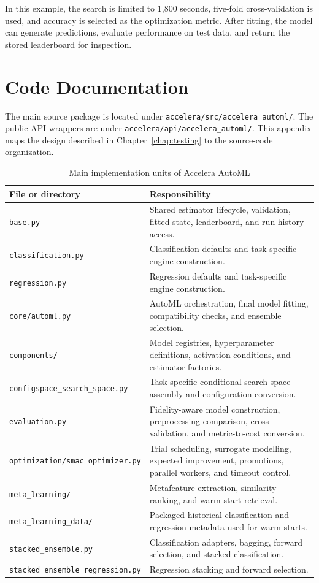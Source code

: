 \documentclass[12pt,a4paper,oneside]{report}
\newcommand{\modulepath}[1]{\texttt{\footnotesize #1}}
\begin{document}
\noindent In this example, the search is limited to 1,800 seconds, five-fold
cross-validation is used, and accuracy is selected as the optimization metric.
After fitting, the model can generate predictions, evaluate performance on test
data, and return the stored leaderboard for inspection.


\chapter{Code Documentation}

The main source package is located under
\modulepath{accelera/src/accelera\_automl/}. The public API wrappers are under
\modulepath{accelera/api/accelera\_automl/}. This appendix maps the design
described in Chapter~\ref{chap:testing} to the source-code organization.

\begin{table}[H]
\centering
\caption{Main implementation units of Accelera AutoML}
\label{tab:appendix-implementation-units}
\small
\renewcommand{\arraystretch}{1.18}
\begin{tabularx}{\textwidth}{p{}X}
\toprule
\textbf{File or directory} & \textbf{Responsibility} \\
\midrule
\modulepath{base.py} &
Shared estimator lifecycle, validation, fitted state, leaderboard, and
run-history access. \\
\modulepath{classification.py} &
Classification defaults and task-specific engine construction. \\
\modulepath{regression.py} &
Regression defaults and task-specific engine construction. \\
\modulepath{core/automl.py} &
AutoML orchestration, final model fitting, compatibility checks, and ensemble
selection. \\
\modulepath{components/} &
Model registries, hyperparameter definitions, activation conditions, and
estimator factories. \\
\modulepath{configspace\_search\_space.py} &
Task-specific conditional search-space assembly and configuration conversion. \\
\modulepath{evaluation.py} &
Fidelity-aware model construction, preprocessing comparison, cross-validation,
and metric-to-cost conversion. \\
\modulepath{optimization/smac\_optimizer.py} &
Trial scheduling, surrogate modelling, expected improvement, promotions,
parallel workers, and timeout control. \\
\modulepath{meta\_learning/} &
Metafeature extraction, similarity ranking, and warm-start retrieval. \\
\modulepath{meta\_learning\_data/} &
Packaged historical classification and regression metadata used for warm
starts. \\
\modulepath{stacked\_ensemble.py} &
Classification adapters, bagging, forward selection, and stacked
classification. \\
\modulepath{stacked\_ensemble\_regression.py} &
Regression stacking and forward selection. \\
\bottomrule
\end{tabularx}
\end{table}
\end{document}
